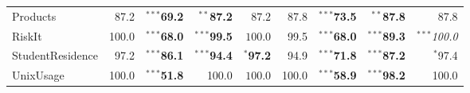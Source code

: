 \documentclass{article}
\newcommand{\schemaForTable}[1]{#1\xspace}
\newcommand{\ProductsForTable}{\schemaForTable{Products}}
\newcommand{\RiskItForTable}{\schemaForTable{RiskIt}}
\newcommand{\StudentResidenceForTable}{\schemaForTable{StudentResidence}}
\newcommand{\UnixUsageForTable}{\schemaForTable{UnixUsage}}
\begin{document}
\begin{table}[!ht]
\begin{center}
{\begin{tabular}{lrrrr|rrrr}
\ProductsForTable&87.2&$^{\ast\ast\ast}$\textbf{69.2}&$^{\ast\ast}$\textbf{87.2}&$87.2$&87.8&$^{\ast\ast\ast}$\textbf{73.5}&$^{\ast\ast}$\textbf{87.8}&87.8\\
\RiskItForTable&100.0&$^{\ast\ast\ast}$\textbf{68.0}&$^{\ast\ast\ast}$\textbf{99.5}&$100.0$&99.5&$^{\ast\ast\ast}$\textbf{68.0}&$^{\ast\ast\ast}$\textbf{89.3}&$^{\ast\ast\ast}$\textit{100.0}\\
\StudentResidenceForTable&97.2&$^{\ast\ast\ast}$\textbf{86.1}&$^{\ast\ast\ast}$\textbf{94.4}&$^{\ast}$\textbf{97.2}&94.9&$^{\ast\ast\ast}$\textbf{71.8}&$^{\ast\ast\ast}$\textbf{87.2}&$^{\ast}$97.4\\
\UnixUsageForTable&100.0&$^{\ast\ast\ast}$\textbf{51.8}&100.0&$100.0$&100.0&$^{\ast\ast\ast}$\textbf{58.9}&$^{\ast\ast\ast}$\textbf{98.2}&100.0\\      \hline
      \end{tabular}
    }
  \end{center}
\end{table}
\end{document}
